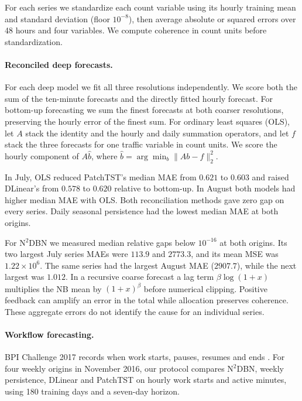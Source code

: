 \documentclass[sigconf]{acmart}
\begin{document}
For each series we standardize each count variable using its hourly training mean and standard deviation (floor \(10^{-8}\)), then average absolute or squared errors over 48 hours and four variables. We compute coherence in count units before standardization.

\paragraph{Reconciled deep forecasts.} For each deep model we fit all three resolutions independently. We score both the sum of the ten-minute forecasts and the directly fitted hourly forecast. For bottom-up forecasting we sum the finest forecasts at both coarser resolutions, preserving the hourly error of the finest sum. For ordinary least squares (OLS), let \(A\) stack the identity and the hourly and daily summation operators, and let \(f\) stack the three forecasts for one traffic variable in count units. We score the hourly component of \(A\hat b\), where \(\hat b=\arg\min_b\|Ab-f\|_2^2\).

In July, OLS reduced PatchTST's median MAE from \(0.621\) to \(0.603\) and raised DLinear's from \(0.578\) to \(0.620\) relative to bottom-up. In August both models had higher median MAE with OLS. Both reconciliation methods gave zero gap on every series. Daily seasonal persistence had the lowest median MAE at both origins.

For N$^2$DBN we measured median relative gaps below \(10^{-16}\) at both origins. Its two largest July series MAEs were \(113.9\) and \(2773.3\), and its mean MSE was \(1.22\times10^6\). The same series had the largest August MAE (\(2907.7\)), while the next largest was \(1.012\). In a recursive coarse forecast a lag term \(\beta\log(1+x)\) multiplies the NB mean by \((1+x)^\beta\) before numerical clipping. Positive feedback can amplify an error in the total while allocation preserves coherence. These aggregate errors do not identify the cause for an individual series.

\paragraph{Workflow forecasting.} BPI Challenge 2017 records when work starts, pauses, resumes and ends \citep{vandongen_bpic2017}. For four weekly origins in November 2016, our protocol compares N$^2$DBN, weekly persistence, DLinear and PatchTST on hourly work starts and active minutes, using 180 training days and a seven-day horizon.
\end{document}
